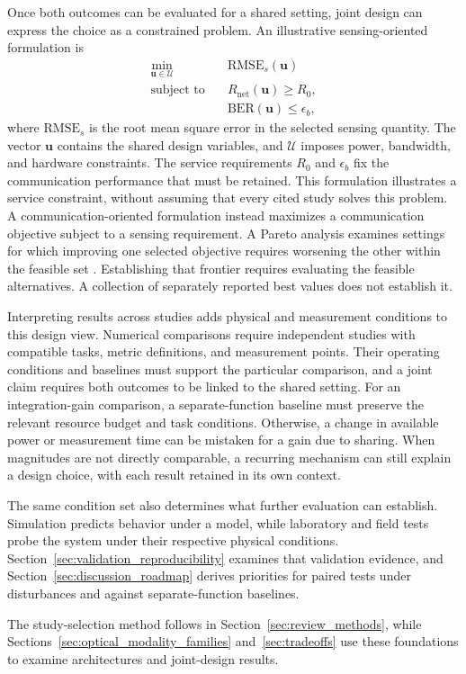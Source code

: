 Once both outcomes can be evaluated for a shared setting, joint design can
express the choice as a constrained problem. An illustrative
sensing-oriented formulation is
\begin{equation}
\begin{aligned}
\min_{\boldsymbol{u}\in\mathcal{U}}\quad&
\mathrm{RMSE}_{s}(\boldsymbol{u})\\
\text{subject to}\quad&
R_{\mathrm{net}}(\boldsymbol{u})\geq R_0,\\
&\mathrm{BER}(\boldsymbol{u})\leq\epsilon_b ,
\end{aligned}
\label{eq:joint_design_service_floor}
\end{equation}
where $\mathrm{RMSE}_{s}$ is the root mean square error in the selected
sensing quantity. The vector $\boldsymbol{u}$ contains the shared design variables, and
$\mathcal{U}$ imposes power, bandwidth, and hardware constraints.
The service requirements $R_0$ and $\epsilon_b$ fix the communication
performance that must be retained. This formulation illustrates a service
constraint, without assuming that every cited study solves this problem.
A communication-oriented formulation instead maximizes a communication
objective subject to a sensing requirement. A Pareto analysis examines
settings for which improving one selected objective requires worsening the
other within the feasible set
\cite{Wen2024OISACArchitectures,Lyu2026PhotonicTHzWaveforms}.
Establishing that frontier requires evaluating the feasible alternatives.
A collection of separately reported best values does not establish it.

Interpreting results across studies adds physical and measurement conditions
to this design view. Numerical comparisons require independent studies with
compatible tasks, metric definitions, and measurement points. Their operating
conditions and baselines must support the particular comparison, and a joint
claim requires both outcomes to be linked to the shared setting.
For an integration-gain comparison, a separate-function baseline must preserve
the relevant resource budget and task conditions. Otherwise, a change in
available power or measurement time can be mistaken for a gain due to sharing.
When magnitudes are not directly comparable, a recurring mechanism can still
explain a design choice, with each result retained in its own context.

The same condition set also determines what further evaluation can establish.
Simulation predicts behavior under a model, while laboratory and field tests
probe the system under their respective physical conditions.
Section~\ref{sec:validation_reproducibility} examines that validation evidence,
and Section~\ref{sec:discussion_roadmap} derives priorities for paired tests
under disturbances and against separate-function baselines.

The study-selection method follows in
Section~\ref{sec:review_methods}, while
Sections~\ref{sec:optical_modality_families} and~\ref{sec:tradeoffs}
use these foundations to examine architectures and joint-design results.

\FloatBarrier

